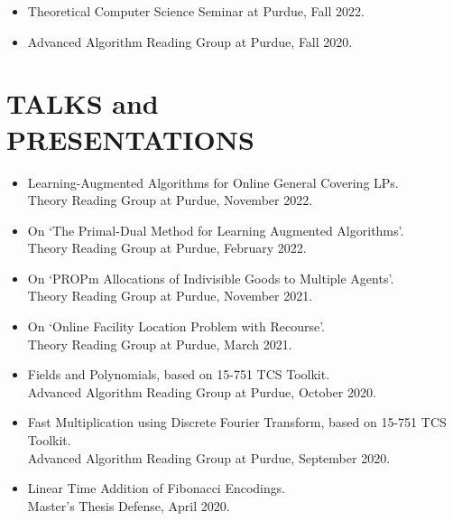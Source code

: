 \documentclass[margin, 10pt]{res} %
\begin{document}
\begin{resume}
\begin{itemize}
\item Theoretical Computer Science Seminar at Purdue, Fall 2022.
\item Advanced Algorithm Reading Group at Purdue, Fall 2020.
\end{itemize}

\section{TALKS and \\ PRESENTATIONS}
\begin{itemize}
\item Learning-Augmented Algorithms for Online General Covering LPs.\\
Theory Reading Group at Purdue, November 2022.
\item On `The Primal-Dual Method for Learning Augmented Algorithms'.\\
Theory Reading Group at Purdue, February 2022.
\item On `PROPm Allocations of Indivisible Goods to Multiple Agents'.\\
Theory Reading Group at Purdue, November 2021.
\item On `Online Facility Location Problem with Recourse'.\\
Theory Reading Group at Purdue, March 2021.
\item Fields and Polynomials, based on 15-751 TCS Toolkit.\\
Advanced Algorithm Reading Group at Purdue, October 2020.
\item Fast Multiplication using Discrete Fourier Transform, based on 15-751 TCS Toolkit.\\
Advanced Algorithm Reading Group at Purdue, September 2020.
\item Linear Time Addition of Fibonacci Encodings.\\
Master's Thesis Defense, April 2020.
\end{itemize}


\end{resume}
\end{document}

